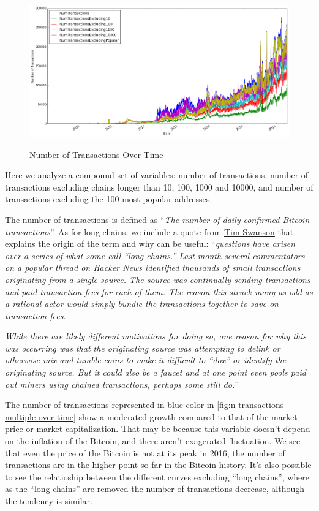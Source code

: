 \begin{figure}[bth]
  \myfloatalign
  {\includegraphics[width=1\linewidth]
    {gfx/n-transactions-multiple-over-time}}
  \caption{Number of Transactions Over Time}
  \label{fig:n-transactions-multiple-over-time}
\end{figure}

Here we analyze a compound set of variables: number of transactions,
number of transactions excluding chains longer than 10, 100, 1000 and
10000, and number of transactions excluding the 100 most popular
addresses. 

The number of transactions is defined as ``\textit{The number of daily
  confirmed Bitcoin transactions}''. As for long chains, we include a
quote from
\href{http://www.ofnumbers.com/2015/01/22/slicing-data-what-comprises-blockchain-transactions/}{Tim
  Swanson} that explains the origin of the term and why can be useful:
``\textit{questions have arisen over a series of what some call “long
  chains.” Last month several commentators on a popular thread on
  Hacker News identified thousands of small transactions originating
  from a single source. The source was continually sending
  transactions and paid transaction fees for each of them. The reason
  this struck many as odd as a rational actor would simply bundle the
  transactions together to save on transaction fees.}

\textit{ While there are likely different motivations for doing so,
  one reason for why this was occurring was that the originating
  source was attempting to delink or otherwise mix and tumble coins to
  make it difficult to “dox” or identify the originating source. But
  it could also be a faucet and at one point even pools paid out
  miners using chained transactions, perhaps some still do.}''


The number of transactions represented in blue color in
\autoref{fig:n-transactions-multiple-over-time} show a moderated
growth compared to that of the market price or market capitalization.
That may be because this variable doesn't depend on the inflation of
the Bitcoin, and there aren't exagerated fluctuation. We see that even
the price of the Bitcoin is not at its peak in 2016, the number of
transactions are in the higher point so far in the Bitcoin history.
It's also possible to see the relatioship between the different curves
excluding ``long chains'', where as the ``long chains'' are removed
the number of transactions decrease, although the tendency is similar.

